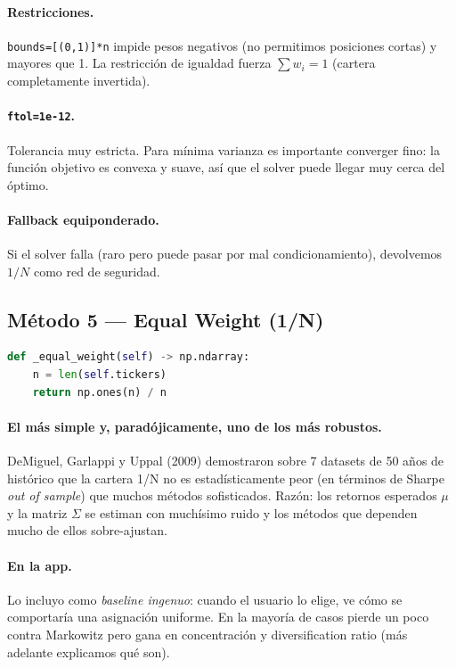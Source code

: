 \documentclass[11pt,a4paper]{book}
\begin{document}
\paragraph{Restricciones.} \texttt{bounds=[(0,1)]*n} impide pesos negativos (no permitimos posiciones cortas) y mayores que 1. La restricción de igualdad fuerza $\sum w_i = 1$ (cartera completamente invertida).

\paragraph{\texttt{ftol=1e-12}.} Tolerancia muy estricta. Para mínima varianza es importante converger fino: la función objetivo es convexa y suave, así que el solver puede llegar muy cerca del óptimo.

\paragraph{Fallback equiponderado.} Si el solver falla (raro pero puede pasar por mal condicionamiento), devolvemos $1/N$ como red de seguridad.

\subsection{Método 5 --- Equal Weight (1/N)}

\begin{lstlisting}[language=Python]
def _equal_weight(self) -> np.ndarray:
    n = len(self.tickers)
    return np.ones(n) / n
\end{lstlisting}

\paragraph{El más simple y, paradójicamente, uno de los más robustos.} DeMiguel, Garlappi y Uppal (2009) demostraron sobre 7 datasets de 50 años de histórico que la cartera 1/N no es estadísticamente peor (en términos de Sharpe \textit{out of sample}) que muchos métodos sofisticados. Razón: los retornos esperados $\mu$ y la matriz $\Sigma$ se estiman con muchísimo ruido y los métodos que dependen mucho de ellos sobre-ajustan.

\paragraph{En la app.} Lo incluyo como \emph{baseline ingenuo}: cuando el usuario lo elige, ve cómo se comportaría una asignación uniforme. En la mayoría de casos pierde un poco contra Markowitz pero gana en concentración y diversification ratio (más adelante explicamos qué son).
\end{document}
